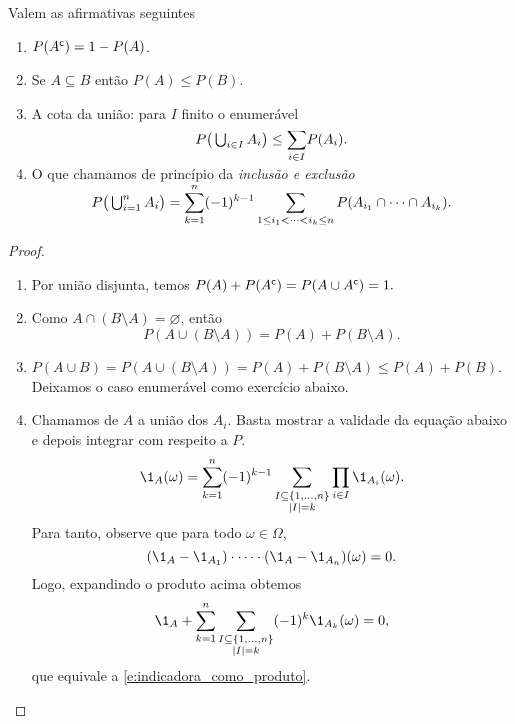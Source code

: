 \documentclass[../main/Notas_de_aula.tex]{subfiles}
\begin{document}
\begin{proposition}
  Valem as afirmativas seguintes
  \begin{enumerate}[\quad a)]
  \item $P(A^{\mathsf{c}}) = 1 - P(A)$.
  \item Se $A \subseteq B$ então $P(A) \leq P(B)$.
  \item A cota da união: para $I$ finito o enumerável
    \begin{equation}
      P\big(\operatorname*{{\textstyle \bigcup}}\nolimits_{i\in I} A_i\big) \leq \smash{\sum\limits_{i\in I}} P(A_i).
    \end{equation}
  \item O que chamamos de princípio da \emph{inclusão e exclusão} 
    \begin{equation}
      P\big(\operatorname*{{\textstyle \bigcup}}\nolimits_{i=1}^{n} A_i\big) = \smash{\sum\limits_{k = 1}^n} (-1)^{k-1} \sum\limits_{1 \leq i_1 < \dots < i_k \leq n} P(A_{i_1} \cap \dots \cap A_{i_k}).
    \end{equation}
  \end{enumerate}
\end{proposition}

\begin{proof}
  \begin{enumerate}[\quad a)]
  \item Por união disjunta, temos $P(A) + P(A^{\mathsf{c}}) = P(A \cup A^{\mathsf{c}}) = 1.$
  \item Como $A \cap (B \setminus A) = \varnothing$, então
    \begin{equation}
        P(A \cup (B \setminus A))= P(A) + P(B \setminus A).
  \end{equation}
  \item $P(A \cup B) = P (A \cup (B \setminus A)) = P(A) + P(B \setminus
    A) \leq P(A) + P(B)$.\\
    Deixamos o caso enumerável como exercício abaixo.
  \item Chamamos de $A$ a união dos $A_i$. Basta mostrar a validade da equação abaixo e depois integrar com
    respeito a $P$.
    \begin{equation}
      \label{e:indicadora_como_produto}
      \1_A(\omega) = \sum_{k=1}^n (-1)^{k - 1} \sum_{\substack{I \subseteq \{1, \dots, n\}\\|I| = k}} \prod_{i \in I} \1_{A_i}(\omega).
    \end{equation}
    Para tanto, observe que para todo $\omega \in \Omega$,
    \begin{equation}
      (\1_A - \1_{A_1}) \cdot \dots \cdot (\1_A - \1_{A_n})(\omega) = 0.
    \end{equation}
    Logo, expandindo o produto acima obtemos
    \begin{equation}
      \1_A + \sum_{k = 1}^n \sum_{\substack{I \subseteq \{1, \dots, n\}\\|I| = k}} (-1)^k \1_{A_k}(\omega) = 0,
    \end{equation}
    que equivale a \eqref{e:indicadora_como_produto}.
  \end{enumerate}
\end{proof}
\end{document}
